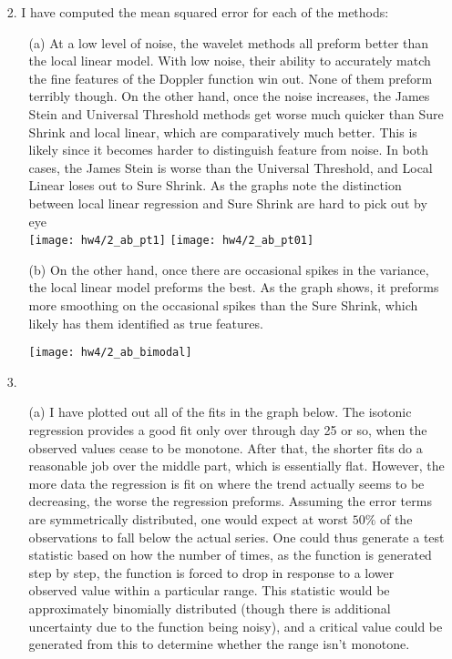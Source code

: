 \documentclass[11pt]{article}
\theoremstyle{definition}
\begin{document}
\begin{itemize}
\begin{itemize}
\begin{itemize}
\begin{itemize}
                        \end{itemize}
                \end{itemize}
        \end{itemize}
    \item[2.]
        I have computed the mean squared error for each of the methods:
        \FloatBarrier
         
        \FloatBarrier
        \begin{itemize}
            \item[(a)]
                At a low level of noise, the wavelet methods all preform better than the local linear model. With low noise, their ability to accurately match the fine features of the Doppler function win out. None of them preform terribly though. On the other hand, once the noise increases, the James Stein and Universal Threshold methods get worse much quicker than Sure Shrink and local linear, which are comparatively much better. This is likely since it becomes harder to distinguish feature from noise. In both cases, the James Stein is worse than the Universal Threshold, and Local Linear loses out to Sure Shrink. As the graphs note the distinction between local linear regression and Sure Shrink are hard to pick out by eye  \\
                \texttt{[image: hw4/2\_ab\_pt1]} 
                \texttt{[image: hw4/2\_ab\_pt01]} \\
            \item[(b)]
                On the other hand, once there are occasional spikes in the variance, the local linear model preforms the best. As the graph shows, it preforms more smoothing on the occasional spikes than the Sure Shrink, which likely has them identified as true features.
                \begin{center}
                    \texttt{[image: hw4/2\_ab\_bimodal]} 
                \end{center}
        \end{itemize}
    \item[3.]
        \begin{itemize}
            \item[(a)]
                I have plotted out all of the fits in the graph below. The isotonic regression provides a good fit only over through day 25 or so, when the observed values cease to be monotone. After that, the shorter fits do a reasonable job over the middle part, which is essentially flat. However, the more data the regression is fit on where the trend actually seems to be decreasing, the worse the regression preforms. Assuming the error terms are symmetrically distributed, one would expect at worst $50\%$ of the observations to fall below the actual series. One could thus generate a test statistic based on how the number of times, as the function is generated step by step, the function is forced to drop in response to a lower observed value within a particular range. This statistic would be approximately binomially distributed (though there is additional uncertainty due to the function being noisy), and a critical value could be generated from this to determine whether the range isn't monotone.

\end{itemize}
\end{itemize}
\end{document}
